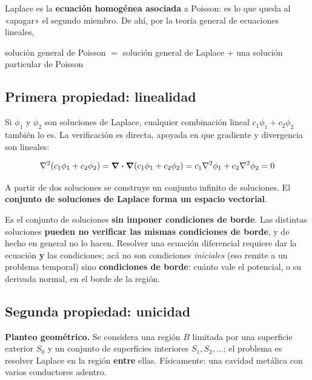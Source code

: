 \documentclass[12pt,a4paper]{article}
\begin{document}
Laplace es la \textbf{ecuación homogénea asociada} a Poisson: es lo que queda al
«apagar» el segundo miembro. De ahí, por la teoría general de ecuaciones lineales,

\begin{center}
solución general de Poisson $=$ solución general de Laplace $+$ una solución
particular de Poisson
\end{center}

\subsection{Primera propiedad: linealidad}

Si $\phi_1$ y $\phi_2$ son soluciones de Laplace, cualquier combinación lineal
$c_1\phi_1 + c_2\phi_2$ también lo es. La verificación es directa, apoyada en que
gradiente y divergencia son lineales:

\[
\laplacian(c_1\phi_1 + c_2\phi_2) = \div\grad(c_1\phi_1 + c_2\phi_2)
= c_1\laplacian\phi_1 + c_2\laplacian\phi_2 = 0
\]

\begin{keybox}[Consecuencia]
A partir de dos soluciones se construye un conjunto infinito de soluciones. El
\textbf{conjunto de soluciones de Laplace forma un espacio vectorial}.
\end{keybox}

\begin{warnbox}
Es el conjunto de soluciones \textbf{sin imponer condiciones de borde}. Las
distintas soluciones \textbf{pueden no verificar las mismas condiciones de
borde}, y de hecho en general no lo hacen. Resolver una ecuación diferencial
requiere dar la ecuación \textbf{y} las condiciones; acá no son condiciones
\emph{iniciales} (eso remite a un problema temporal) sino \textbf{condiciones de
borde}: cuánto vale el potencial, o su derivada normal, en el borde de la región.
\end{warnbox}

\subsection{Segunda propiedad: unicidad}

\textbf{Planteo geométrico.} Se considera una región $B$ limitada por una
superficie exterior $S_0$ y un conjunto de superficies interiores
$S_1, S_2, \dots$; el problema es resolver Laplace en la región \textbf{entre}
ellas. Físicamente: una cavidad metálica con varios conductores adentro.
\end{document}
